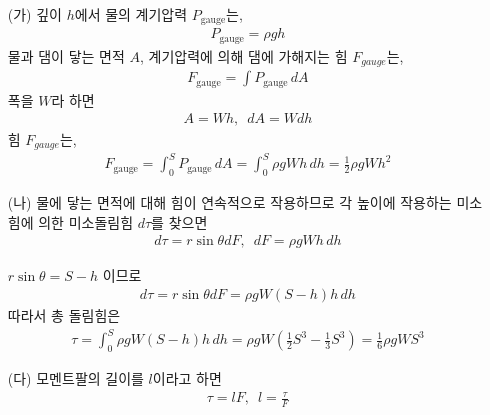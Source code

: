 \documentclass[floatfix,nofootinbib,superscriptaddress,fleqn]{revtex4-2}
\begin{document}
\begin{itemize}
  \item[(가)]
  깊이 $h$에서 물의 계기압력 $P_{\mathrm{gauge}}$는,
  \begin{align}
    P_{\mathrm{gauge}} = \rho g h
  \end{align}
  물과 댐이 닿는 면적 $A$, 계기압력에 의해 댐에 가해지는 힘 $F_{gauge}$는,
  \begin{align}
    F_{\mathrm{gauge}} = \int P_{\mathrm{gauge}}\,dA
  \end{align}
  폭을 $W$라 하면
  \begin{align}
    A = Wh,\,\,\, dA = Wdh
  \end{align}
  힘 $F_{gauge}$는,
  \begin{align}
    F_{\mathrm{gauge}} = \int^S_0 P_{\mathrm{gauge}}\,dA
    =\int^S_0 \rho g W h\,dh = \frac{1}{2}\rho g Wh^2
  \end{align}
  \item[(나)] 물에 닿는 면적에 대해 힘이 연속적으로 작용하므로 
  각 높이에 작용하는 미소힘에 의한 미소돌림힘 $d\tau$를 찾으면
  \begin{align}
    d\tau = r\sin\theta dF,\,\,\,dF=\rho g Wh\,dh
  \end{align}

  \begin{figure}[htbp]
  \end{figure}

  $r\sin\theta=S-h$ 이므로 
  \begin{align}
    d\tau = r\sin\theta dF
    =\rho g W (S-h)h \,dh
  \end{align}
  따라서 총 돌림힘은
  \begin{align}
    \tau =\int_0^S \rho g W (S-h)h \,dh 
    = \rho g W\left(\frac{1}{2}S^3-\frac{1}{3}S^3\right)
    =\frac{1}{6}\rho g WS^3
  \end{align}
  \item[(다)] 모멘트팔의 길이를 $l$이라고 하면
  \begin{align}
    \tau = lF,\,\,\,l = \frac{\tau}{F}
  \end{align}
\end{itemize}
\end{document}
